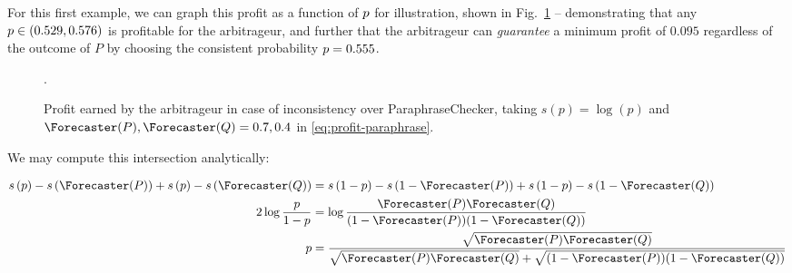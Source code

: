For this first example, we can graph this profit as a function of $p$ for illustration, shown in Fig.~\ref{fig:profit-paraphrase} -- demonstrating that any $p\in(0.529,0.576)$ is profitable for the arbitrageur, and further that the arbitrageur can \textit{guarantee} a minimum profit of $0.095$ regardless of the outcome of $P$ by choosing the consistent probability $p=0.555$.

\begin{figure}
\centering
{}
\caption{Profit earned by the arbitrageur in case of inconsistency over ParaphraseChecker, taking $s(p)=\log(p)$ and $\priceP,\priceQ=0.7,0.4$ in \eqref{eq:profit-paraphrase}.}
\label{fig:profit-paraphrase}.
\end{figure}

We may compute this intersection analytically:

\begin{align*}
    \score{\consp}-\score{\priceP}+\score{\consp}-\score{\priceQ} &=
    \score{1-\consp}-\score{1-\priceP}+\score{1-\consp}-\score{1-\priceQ} \\
    2\log\frac{\consp}{1-\consp}&=\log\frac{\priceP\priceQ}{(1-\priceP)(1-\priceQ)} \\
    \consp &= \frac{\sqrt{\priceP\priceQ}}{\sqrt{\priceP\priceQ}+\sqrt{(1-\priceP)(1-\priceQ)}} \\
\end{align*}


